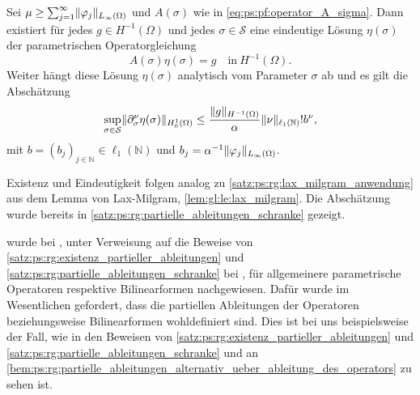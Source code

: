 \begin{Satz}
\label{satz:ps:rg:operatorgleichung_zusammenfassung}
    Sei $\mu \geq \sum_{j = 1}^{\infty} \lVert\varphi_{j}\rVert_{L_{\infty}(\Omega)}$ und $A(\sigma)$ wie in \cref{eq:ps:pf:operator_A_sigma}.
    Dann existiert für jedes $g \in H^{-1}(\Omega)$ und jedes $\sigma \in \mathcal S$ eine eindeutige Lösung $\eta(\sigma)$ der parametrischen Operatorgleichung
    \begin{equation}
        A(\sigma) \eta(\sigma) = g \quad \text{in}~H^{-1}(\Omega).
    \end{equation}
    Weiter hängt diese Lösung $\eta(\sigma)$ analytisch vom Parameter $\sigma$ ab und es gilt die Abschätzung
    \begin{equation}
        \sup_{\sigma \in \mathcal S} \lVert\partial^{\nu}_{\sigma} \eta(\sigma)\rVert_{H^{1}_{0}(\Omega)} \leq \frac{\lVert g\rVert_{H^{-1}(\Omega)}}{\alpha} \lVert\nu\rVert_{\ell_{1}(\mathbb{N})}! b^{\nu},
    \end{equation}
    mit $b = (b_{j})_{j \in \mathbb{N}} \in \ell_{1}(\mathbb{N})$ und $b_{j} = \alpha^{-1} \lVert\varphi_{j}\rVert_{L_{\infty}(\Omega)}$.

    \begin{Beweis}
        Existenz und Eindeutigkeit folgen analog zu \cref{satz:ps:rg:lax_milgram_anwendung} aus dem Lemma von Lax-Milgram, \cref{lem:gl:le:lax_milgram}.
        Die Abschätzung wurde bereits in \cref{satz:ps:rg:partielle_ableitungen_schranke} gezeigt.
    \end{Beweis}
\end{Satz}


 wurde bei \textcite[Theorem 4]{Kunoth:2013ef}, unter Verweisung auf die Beweise von \cref{satz:ps:rg:existenz_partieller_ableitungen} und \cref{satz:ps:rg:partielle_ableitungen_schranke} bei \textcite[Theorem 4.2, 4.3]{Cohen:2010kz}, für allgemeinere parametrische Operatoren respektive Bilinearformen nachgewiesen.
Dafür wurde im Wesentlichen gefordert, dass die partiellen Ableitungen der Operatoren beziehungsweise Bilinearformen wohldefiniert sind.
Dies ist bei uns beispielsweise der Fall, wie in den Beweisen von \cref{satz:ps:rg:existenz_partieller_ableitungen} und \cref{satz:ps:rg:partielle_ableitungen_schranke} und an \cref{bem:ps:rg:partielle_ableitungen_alternativ_ueber_ableitung_des_operators} zu sehen ist.


